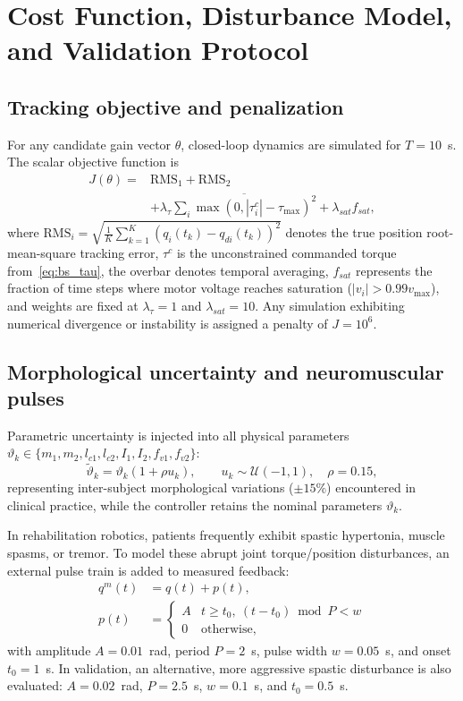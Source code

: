 \documentclass[a4paper,fleqn]{cas-dc}
\begin{document}
\section{Cost Function, Disturbance Model, and Validation Protocol}\label{sec:cost}

\subsection{Tracking objective and penalization}
For any candidate gain vector $\theta$, closed-loop dynamics are simulated for $T=10$~s. The scalar objective function is
\begin{equation}
\begin{aligned}
J(\theta)={}&\mathrm{RMS}_1+\mathrm{RMS}_2\\
&+\lambda_\tau\overline{\textstyle\sum_i\max(0,|\tau_i^c|-\tau_{\max})^2}+\lambda_{sat}f_{sat},
\end{aligned}
\label{eq:cost}
\end{equation}
where $\mathrm{RMS}_i=\sqrt{\frac{1}{K}\sum_{k=1}^K(q_i(t_k)-q_{di}(t_k))^2}$ denotes the true position root-mean-square tracking error, $\tau^c$ is the unconstrained commanded torque from~\eqref{eq:bs_tau}, the overbar denotes temporal averaging, $f_{sat}$ represents the fraction of time steps where motor voltage reaches saturation ($|v_i|>0.99v_{\max}$), and weights are fixed at $\lambda_\tau=1$ and $\lambda_{sat}=10$. Any simulation exhibiting numerical divergence or instability is assigned a penalty of $J=10^6$.

\subsection{Morphological uncertainty and neuromuscular pulses}
Parametric uncertainty is injected into all physical parameters $\vartheta_k\in\{m_1,m_2,l_{c1},l_{c2},I_1,I_2,f_{v1},f_{v2}\}$:
\begin{equation}
\tilde\vartheta_k=\vartheta_k(1+\rho u_k),\qquad u_k\sim\mathcal U(-1,1),\quad \rho=0.15,
\label{eq:uncertainty}
\end{equation}
representing inter-subject morphological variations ($\pm15\%$) encountered in clinical practice, while the controller retains the nominal parameters $\vartheta_k$.

In rehabilitation robotics, patients frequently exhibit spastic hypertonia, muscle spasms, or tremor. To model these abrupt joint torque/position disturbances, an external pulse train is added to measured feedback:
\begin{equation}
\begin{aligned}
q^m(t)&=q(t)+p(t),\\
p(t)&=\begin{cases}A & t\ge t_0,\ (t-t_0)\bmod P<w\\0&\text{otherwise},\end{cases}
\end{aligned}
\label{eq:pulse}
\end{equation}
with amplitude $A=0.01$~rad, period $P=2$~s, pulse width $w=0.05$~s, and onset $t_0=1$~s. In validation, an alternative, more aggressive spastic disturbance is also evaluated: $A=0.02$~rad, $P=2.5$~s, $w=0.1$~s, and $t_0=0.5$~s.
\end{document}
